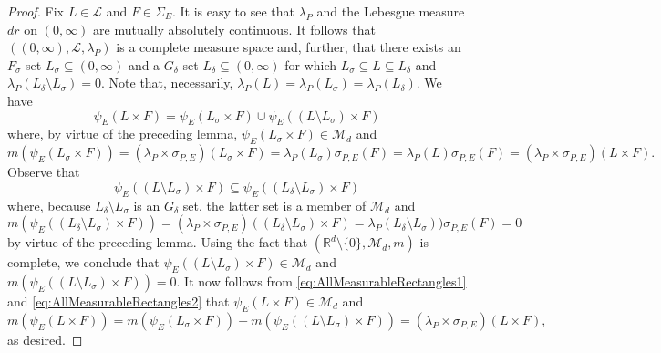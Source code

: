 \documentclass[11pt]{article}
\theoremstyle{remark}
\begin{document}
\begin{proof}
Fix $L\in\mathcal{L}$ and $F\in\Sigma_E$. It is easy to see that $\lambda_P$ and the Lebesgue measure $dr$ on $(0,\infty)$ are mutually absolutely continuous. It follows that $((0,\infty), \mathcal{L},\lambda_P)$ is a complete measure space and, further, that there exists an $F_\sigma$ set $L_\sigma\subseteq (0,\infty)$ and a $G_\delta$ set $L_\delta\subseteq (0,\infty)$ for which $L_\sigma\subseteq L\subseteq L_\delta$ and $\lambda_P(L_\delta\setminus L_\sigma)=0$. Note that, necessarily, $\lambda_P(L)=\lambda_P(L_\sigma)=\lambda_P(L_\delta)$. We have
\begin{equation}\label{eq:AllMeasurableRectangles1}
\psi_E(L\times F)=\psi_E( L_\sigma\times F)\cup\psi_E((L\setminus L_\sigma)\times F)
\end{equation}
where, by virtue of the preceding lemma, $\psi_E(L_\sigma\times F)\in \mathcal{M}_d$ and
\begin{equation}\label{eq:AllMeasurableRectangles2}
m(\psi_E(L_{\sigma}\times F))=(\lambda_P\times\sigma_{P,E})( L_\sigma\times F)=\lambda_P(L_\sigma)\sigma_{P,E}(F)=\lambda_P(L)\sigma_{P,E}(F)=(\lambda_P\times\sigma_{P,E})(L\times F).
\end{equation}
Observe that
\begin{equation*}
\psi_E((L\setminus L_\sigma)\times F)\subseteq \psi_E((L_{\delta}\setminus L_\sigma)\times F)
\end{equation*}
where, because $L_\delta\setminus L_\sigma$ is an $G_{\delta}$ set, the latter set is a member of $\mathcal{M}_d$ and
\begin{equation*}
m(\psi_E((L_\delta\setminus L_\sigma)\times F))=(\lambda_P\times\sigma_{P,E})((L_\delta\setminus L_\sigma)\times F)=\lambda_P(L_\delta\setminus L_\sigma))\sigma_{P,E}(F)=0
\end{equation*}
by virtue of the preceding lemma. Using the fact that $(\mathbb{R}^d\setminus\{0\},\mathcal{M}_d,m)$ is complete, we conclude that $\psi_E((L\setminus L_\sigma)\times F)\in \mathcal{M}_d$ and $m(\psi_E((L\setminus L_\sigma)\times F))=0$. It now follows from \eqref{eq:AllMeasurableRectangles1} and \eqref{eq:AllMeasurableRectangles2} that $\psi_E(L\times F)\in\mathcal{M}_d$ and
\begin{equation*}
m(\psi_E(L\times F))=m(\psi_E(L_\sigma\times F))+m(\psi_E((L\setminus L_\sigma)\times F))=(\lambda_P\times\sigma_{P,E})(L\times F),
\end{equation*}
as desired.
\end{proof}
\end{document}
